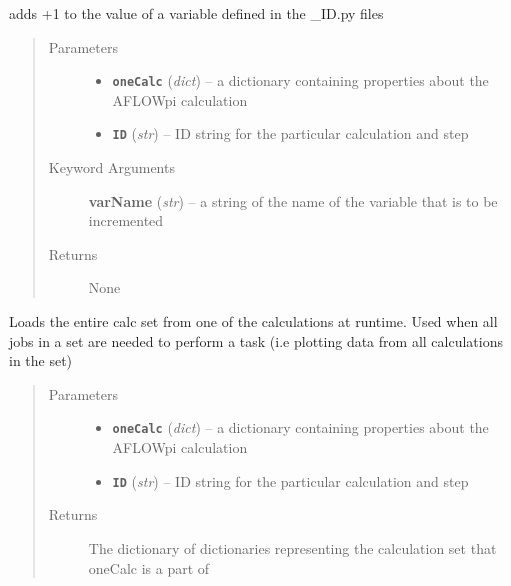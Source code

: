 \documentclass[letterpaper,10pt,english]{sphinxmanual}
\begin{document}

\begin{fulllineitems}
\label{prep:prep.__incrementFileValue}
adds +1 to the value of a variable defined in the \_ID.py files
\begin{quote}\begin{description}
\item[{Parameters}] \leavevmode\begin{itemize}
\item {} 
\textbf{\texttt{oneCalc}} (\emph{dict}) -- a dictionary containing properties about the AFLOWpi calculation

\item {} 
\textbf{\texttt{ID}} (\emph{str}) -- ID string for the particular calculation and step

\end{itemize}

\item[{Keyword Arguments}] \leavevmode
\textbf{varName} (\emph{str}) --
a string of the name of the variable that is to be incremented

\item[{Returns}] \leavevmode
None

\end{description}\end{quote}

\end{fulllineitems}


\begin{fulllineitems}
\label{prep:prep.__loadCalcsFromOneCalc}
Loads the entire calc set from one of the calculations at runtime. Used when all jobs in
a set are needed to perform a task (i.e plotting data from all calculations in the set)
\begin{quote}\begin{description}
\item[{Parameters}] \leavevmode\begin{itemize}
\item {} 
\textbf{\texttt{oneCalc}} (\emph{dict}) -- a dictionary containing properties about the AFLOWpi calculation

\item {} 
\textbf{\texttt{ID}} (\emph{str}) -- ID string for the particular calculation and step

\end{itemize}

\item[{Returns}] \leavevmode
The dictionary of dictionaries representing the calculation set that oneCalc
is a part of

\end{description}\end{quote}

\end{fulllineitems}
\end{document}
